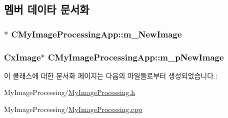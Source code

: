 \subsection{멤버 데이타 문서화}
\hypertarget{class_c_my_image_processing_app_aa5a25236bb1a996bb2c86864d54fba25}{
\subsubsection[{m\-\_\-\-New\-Image}]{$\ast$ C\-My\-Image\-Processing\-App\-::m\-\_\-\-New\-Image}}\label{class_c_my_image_processing_app_aa5a25236bb1a996bb2c86864d54fba25}
\hypertarget{class_c_my_image_processing_app_ad42155c6a3d9aad19b57bb15a06ddda9}{
\subsubsection[{m\-\_\-p\-New\-Image}]{\setlength{\rightskip}{0pt plus 5cm}Cx\-Image$\ast$ C\-My\-Image\-Processing\-App\-::m\-\_\-p\-New\-Image}}\label{class_c_my_image_processing_app_ad42155c6a3d9aad19b57bb15a06ddda9}


이 클래스에 대한 문서화 페이지는 다음의 파일들로부터 생성되었습니다.\-:\begin{DoxyCompactItemize}
\item 
My\-Image\-Processing/\hyperlink{_my_image_processing_8h}{My\-Image\-Processing.\-h}\item 
My\-Image\-Processing/\hyperlink{_my_image_processing_8cpp}{My\-Image\-Processing.\-cpp}\end{DoxyCompactItemize}

